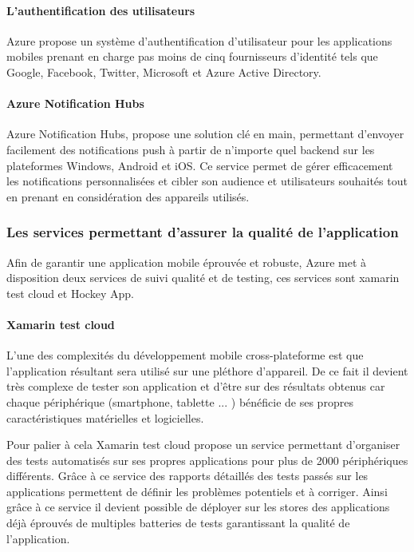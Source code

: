 \documentclass[11]{article}
\begin{document}
\paragraph{L’authentification des utilisateurs}
Azure propose un système d’authentification d’utilisateur pour les applications mobiles prenant en charge pas moins de cinq fournisseurs d’identité tels que Google, Facebook, Twitter,  Microsoft et Azure Active Directory.
 
\paragraph{Azure Notification Hubs}
Azure Notification Hubs, propose une solution clé en main, permettant d’envoyer facilement des notifications push à partir de n'importe quel backend sur les plateformes Windows, Android et iOS.
Ce service permet de gérer efficacement les notifications personnalisées et cibler son audience et utilisateurs souhaités tout en prenant en considération des appareils utilisés.

\subsubsection{Les services permettant d’assurer la qualité de l’application}
Afin de garantir une application mobile éprouvée et robuste, Azure met à disposition deux services de suivi qualité et de testing, ces services sont xamarin test cloud et Hockey App.
 
\paragraph{Xamarin test cloud}
L’une des complexités du développement mobile cross-plateforme est que l’application résultant sera utilisé sur une pléthore d’appareil. De ce fait il devient très complexe de tester son application et d’être sur des résultats obtenus car chaque périphérique (smartphone, tablette ... ) bénéficie de ses propres caractéristiques matérielles et logicielles.
      
\vspace{0.5cm}
   
Pour palier à cela Xamarin test cloud propose un service permettant d’organiser des tests automatisés sur ses propres applications pour plus de 2000 périphériques différents.
Grâce à ce service des rapports détaillés des tests passés sur les applications permettent de définir les problèmes potentiels et à corriger.
Ainsi grâce à ce service il devient possible de déployer sur les stores des applications déjà éprouvés de multiples batteries de tests garantissant la qualité de l’application.
\end{document}
